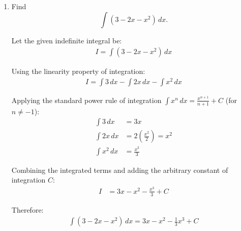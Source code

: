 \begin{enumerate}[label=\thesubsection.\arabic*, ref=\thesubsection.\theenumi]
The Cartesian equation of a line passing through the point $(x_1, y_1, z_1)$ with direction ratios $a, b, c$ is given by:
\begin{align*}
	\frac{x - x_1}{a} = \frac{y - y_1}{b} = \frac{z - z_1}{c}
\end{align*}

Substituting the coordinates and direction ratios:
\begin{align*}
	\frac{x - 2}{1} = \frac{y - (-1)}{1} = \frac{z - 4}{-2}
\end{align*}

Simplifying the equation:
\begin{align*}
	\frac{x - 2}{1} = \frac{y + 1}{1} = \frac{z - 4}{-2}
\end{align*}

Therefore, the equation of the line in Cartesian form is:
\begin{align*}
	\frac{x - 2}{1} = \frac{y + 1}{1} = \frac{4 - z}{2} \quad \left(\text{or } \frac{x - 2}{1} = \frac{y + 1}{1} = \frac{z - 4}{-2}\right)
\end{align*}

\item Find 
\[
\int (3-2x-x^2)\,dx.
\]

\solution
Let the given indefinite integral be:
\begin{align*}
	I = \int (3 - 2x - x^2)\,dx
\end{align*}

Using the linearity property of integration:
\begin{align*}
	I = \int 3\,dx - \int 2x\,dx - \int x^2\,dx
\end{align*}

Applying the standard power rule of integration $\displaystyle\int x^n\,dx = \frac{x^{n+1}}{n+1} + C$ (for $n \neq -1$):
\begin{align*}
	\int 3\,dx &= 3x \\
	\int 2x\,dx &= 2\left(\frac{x^2}{2}\right) = x^2 \\
	\int x^2\,dx &= \frac{x^3}{3}
\end{align*}

Combining the integrated terms and adding the arbitrary constant of integration $C$:
\begin{align*}
	I &= 3x - x^2 - \frac{x^3}{3} + C
\end{align*}

Therefore:
\begin{align*}
	\int (3 - 2x - x^2)\,dx = 3x - x^2 - \frac{1}{3}x^3 + C
\end{align*}


\end{enumerate}
